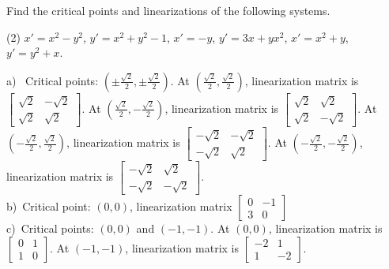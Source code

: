 \begin{exercise}
Find the critical points and linearizations of the following systems.
\begin{tasks}(2)
\task $x'=x^2-y^2$, \enspace $y'=x^2+y^2-1$,
\task $x'=-y$, \enspace $y'=3x+yx^2$,
\task $x'=x^2+y$, \enspace $y'=y^2+x$.
\end{tasks}
\end{exercise}
\comboSol{%
}
{%
a)~ Critical points: $\left(\pm \frac{\sqrt{2}}{2}, \pm \frac{\sqrt{2}}{2}\right)$. At $\left(\frac{\sqrt{2}}{2}, \frac{\sqrt{2}}{2}\right)$, linearization matrix is $\left[\begin{smallmatrix} \sqrt{2} & -\sqrt{2} \\ \sqrt{2} & \sqrt{2} \end{smallmatrix}\right]$. At $\left(\frac{\sqrt{2}}{2}, -\frac{\sqrt{2}}{2}\right)$, linearization matrix is $\left[\begin{smallmatrix} \sqrt{2} & \sqrt{2} \\ \sqrt{2} & -\sqrt{2} \end{smallmatrix}\right]$.
At $\left(-\frac{\sqrt{2}}{2}, \frac{\sqrt{2}}{2}\right)$, linearization matrix is $\left[\begin{smallmatrix} -\sqrt{2} & -\sqrt{2} \\ -\sqrt{2} & \sqrt{2} \end{smallmatrix}\right]$. At $\left(-\frac{\sqrt{2}}{2}, -\frac{\sqrt{2}}{2}\right)$, linearization matrix is $\left[\begin{smallmatrix} -\sqrt{2} & \sqrt{2} \\ -\sqrt{2} & -\sqrt{2} \end{smallmatrix}\right]$. \\
b)~Critical point: $(0,0)$, linearization matrix $\left[\begin{smallmatrix} 0 & -1 \\ 3 & 0 \end{smallmatrix}\right]$\\
c)~Critical points: $(0,0)$ and $(-1, -1)$. At $(0,0)$, linearization matrix is $\left[\begin{smallmatrix} 0 & 1 \\ 1 & 0 \end{smallmatrix}\right]$. At $(-1, -1)$, linearization matrix is $\left[\begin{smallmatrix} -2 & 1 \\ 1 & -2 \end{smallmatrix}\right]$.
}


